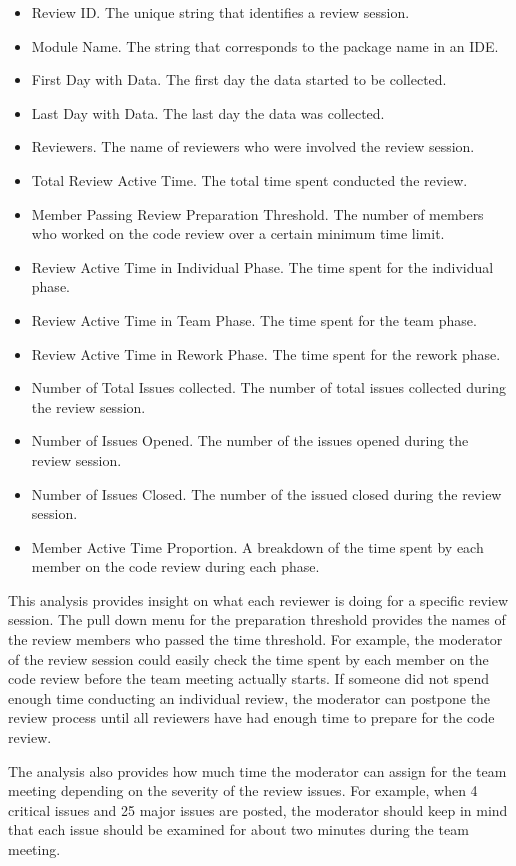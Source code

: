 \begin{itemize}
	\item Review ID. The unique string that identifies a review session.
	\item Module Name. The string that corresponds to the package name in an IDE.
	\item First Day with Data. The first day the data started to be collected.
	\item Last Day with Data. The last day the data was collected.
	\item Reviewers. The name of reviewers who were involved the review session.
	\item Total Review Active Time. The total time spent conducted the review.
	\item Member Passing Review Preparation Threshold. The number of members who worked on the code review over a certain minimum time limit.
	\item Review Active Time in Individual Phase. The time spent for the individual phase.
	\item Review Active Time in Team Phase. The time spent for the team phase.
	\item Review Active Time in Rework Phase. The time spent for the rework phase.
	\item Number of Total Issues collected. The number of total issues collected during the review session.
	\item Number of Issues Opened. The number of the issues opened during the review session.
	\item Number of Issues Closed. The number of the issued closed during the review session.
	\item Member Active Time Proportion. A breakdown of the time spent by each member on the code review during each phase.
\end{itemize}

This analysis provides insight on what each reviewer is doing for a specific review session. The pull down menu for the preparation threshold provides the names of the review members who passed the time threshold. For example, the moderator of the review session could easily check the time spent by each member on the code review before the team meeting actually starts. If someone did not spend enough time conducting an individual review, the moderator can postpone the review process until all reviewers have had enough time to prepare for the code review.

The analysis also provides how much time the moderator can assign for the team meeting depending on the severity of the review issues. For example, when 4 critical issues and 25 major issues are posted, the moderator should keep in mind that each issue should be examined for about two minutes during the team meeting.

